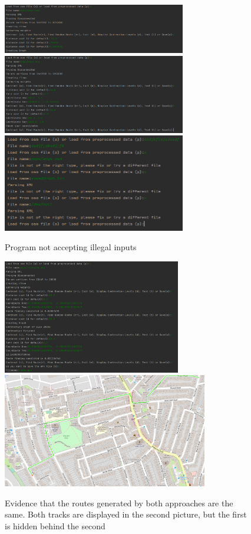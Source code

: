\documentclass[11pt,twoside,a4paper]{report}
\begin{document}
\begin{figure}[h]
    \begin{center}
        \includegraphics[width=8cm]{distancecost.png}\\
        \includegraphics[width=8cm]{coordinateinput.png}\\
        \includegraphics[width=8cm]{loadfile.png}
    \end{center}
    \caption{Program not accepting illegal inputs}
    \label{No illegal inputs}
\end{figure}
\begin{figure}[h]
    \begin{center}
        \includegraphics[height=5cm]{checkContraction.png}\includegraphics[height=5cm]{overlap.png}
    \end{center}
    \caption{Evidence that the routes generated by both approaches are the same. Both tracks are displayed in the second picture, but the first is hidden behind the second}
    \label{contractoverlap}
\end{figure}
\end{document}
